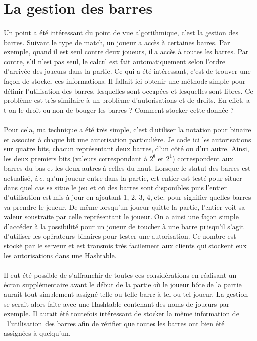 \documentclass[a4paper,12pt]{report}
\begin{document}
\section{La gestion des barres}
\paragraph{}
Un point a été intéressant du point de vue algorithmique, c'est la gestion des barres. Suivant le type de match, un joueur a accès à certaines barres. Par exemple, quand il est seul contre deux joueurs, il a accès à toutes les barres. Par contre, s'il n'est pas seul, le calcul est fait automatiquement selon l'ordre d'arrivée des joueurs dans la partie. Ce qui a été intéressant, c'est de trouver une façon de stocker ces informations. Il fallait ici obtenir une méthode simple pour définir \og l'utilisation \fg des barres, lesquelles sont occupées et lesquelles sont libres. Ce problème est très similaire à un problème d'autorisations et de droits. En effet, a-t-on le droit ou non de bouger les barres ? Comment stocker cette donnée ?
\paragraph{}
Pour cela, ma technique a été très simple, c'est d'utiliser la notation pour binaire et associer à chaque bit une autorisation particulière. Je code ici les autorisations sur quatre bits, chacun représentant deux barres, d'un côté ou d'un autre. Ainsi, les deux premiers bits (valeurs correspondant à \(2^0\) et \(2^1\)) correspondent aux barres du bas et les deux autres à celles du haut. Lorsque le statut des barres est actualisé, \emph{i.e. } qu'un joueur entre dans la partie, cet entier est testé pour situer dans quel cas se situe le jeu et où des barres sont disponibles puis l'entier d'utilisation est mis à jour en ajoutant 1, 2, 3, 4, etc. pour signifier quelles barres va prendre le joueur. De même lorsqu'un joueur quitte la partie, l'entier voit sa valeur soustraite par celle représentant le joueur. On a ainsi une façon simple d'accéder à la possibilité pour un joueur de toucher à une barre puisqu'il s'agit d'utiliser les opérateurs binaires pour tester une autorisation. Ce nombre est stocké par le serveur et est transmis très facilement aux clients qui stockent eux les autorisations dans une Hashtable.
\paragraph{}
Il eut été possible de s'affranchir de toutes ces considérations en réalisant un écran supplémentaire avant le début de la partie où le joueur hôte de la partie aurait tout simplement assigné telle ou telle barre à tel ou tel joueur. La gestion se serait alors faite avec une Hashtable contenant des noms de joueurs par exemple. Il aurait été toutefois intéressant de stocker la même information de \og l'utilisation \fg  des barres afin de vérifier que toutes les barres ont bien été assignées à quelqu'un.
\end{document}
